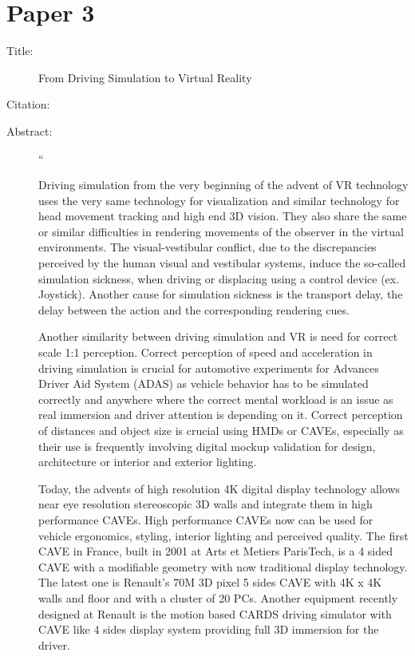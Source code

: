\documentclass{scrartcl}
\begin{document}
	\section*{Paper 3}
	\begin{description}
		\item[Title:] From Driving Simulation to Virtual Reality
		\item[Citation:] \cite{Kemeny}
		\item[Abstract:] ``
		
		Driving simulation from the very beginning of the advent of VR technology uses the very same technology for visualization and similar technology for head movement tracking and high end 3D vision. They also share the same or similar difficulties in rendering movements of the observer in the virtual environments. The visual-vestibular conflict, due to the discrepancies perceived by the human visual and vestibular systems, induce the so-called simulation sickness, when driving or displacing using a control device (ex. Joystick). Another cause for simulation sickness is the transport delay, the delay between the action and the corresponding rendering cues.
		
		Another similarity between driving simulation and VR is need for correct scale 1:1 perception. Correct perception of speed and acceleration in driving simulation is crucial for automotive experiments for Advances Driver Aid System (ADAS) as vehicle behavior has to be simulated correctly and anywhere where the correct mental workload is an issue as real immersion and driver attention is depending on it. Correct perception of distances and object size is crucial using HMDs or CAVEs, especially as their use is frequently involving digital mockup validation for design, architecture or interior and exterior lighting.
		
		Today, the advents of high resolution 4K digital display technology allows near eye resolution stereoscopic 3D walls and integrate them in high performance CAVEs. High performance CAVEs now can be used for vehicle ergonomics, styling, interior lighting and perceived quality. The first CAVE in France, built in 2001 at Arts et Metiers ParisTech, is a 4 sided CAVE with a modifiable geometry with now traditional display technology. The latest one is Renault's 70M 3D pixel 5 sides CAVE with 4K x 4K walls and floor and with a cluster of 20 PCs. Another equipment recently designed at Renault is the motion based CARDS driving simulator with CAVE like 4 sides display system providing full 3D immersion for the driver.
		

\end{description}
\end{document}
